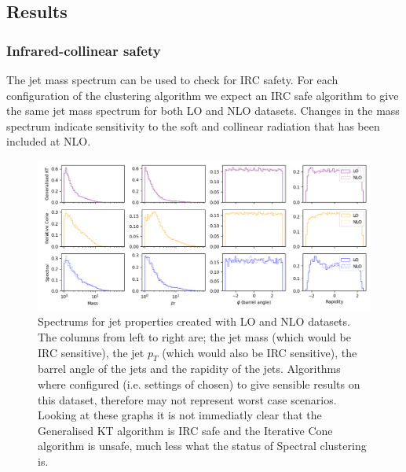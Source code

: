\subsection{Results}

\subsubsection{Infrared-collinear safety}
The jet mass spectrum can be used to check for IRC safety.
For each configuration of the clustering algorithm we expect an IRC safe algorithm to give the 
same jet mass spectrum for both LO and NLO datasets.
Changes in the mass spectrum indicate sensitivity to the soft and collinear radiation that
has been included at NLO.


\begin{figure}[htp]
    \includegraphics[width=\textwidth]{graphics/IRC_singles}
    \caption{Spectrums for jet properties created with LO and NLO datasets.
             The columns from left to right are; the jet mass (which would be IRC sensitive),
             the jet \(p_T\) (which would also be IRC sensitive),
             the barrel angle of the jets and the rapidity of the jets.
             Algorithms where configured (i.e. settings of \stoppingdeltar{} chosen)
             to give sensible results on
             this dataset, therefore may not represent worst case scenarios.
             Looking at these graphs it is not immediatly clear that the Generalised KT
             algorithm is IRC safe and the Iterative Cone algorithm is unsafe, 
         much less what the status of Spectral clustering is.}

\end{figure}
